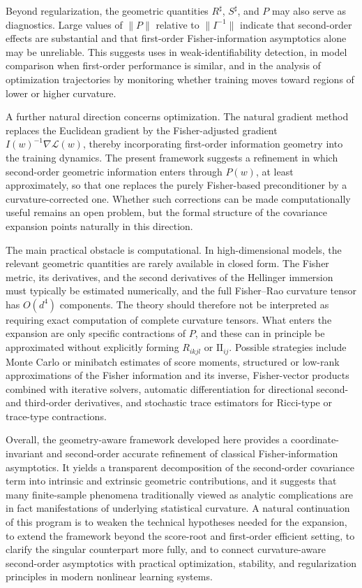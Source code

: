 \documentclass[11pt,letterpaper]{amsart}
\numberwithin{equation}{section}
\theoremstyle{plain}
\theoremstyle{definition}
\theoremstyle{remark}
\begin{document}
Beyond regularization, the geometric quantities \(R^\sharp\), \(S^\sharp\), and \(P\) may also serve as diagnostics. Large values of \(\|P\|\) relative to \(\|I^{-1}\|\) indicate that second-order effects are substantial and that first-order Fisher-information asymptotics alone may be unreliable. This suggests uses in weak-identifiability detection, in model comparison when first-order performance is similar, and in the analysis of optimization trajectories by monitoring whether training moves toward regions of lower or higher curvature.

A further natural direction concerns optimization. The natural gradient method replaces the Euclidean gradient by the Fisher-adjusted gradient \(I(w)^{-1}\nabla \mathcal L(w)\), thereby incorporating first-order information geometry into the training dynamics. The present framework suggests a refinement in which second-order geometric information enters through \(P(w)\), at least approximately, so that one replaces the purely Fisher-based preconditioner by a curvature-corrected one. Whether such corrections can be made computationally useful remains an open problem, but the formal structure of the covariance expansion points naturally in this direction.

The main practical obstacle is computational. In high-dimensional models, the relevant geometric quantities are rarely available in closed form. The Fisher metric, its derivatives, and the second derivatives of the Hellinger immersion must typically be estimated numerically, and the full Fisher--Rao curvature tensor has \(O(d^4)\) components. The theory should therefore not be interpreted as requiring exact computation of complete curvature tensors. What enters the expansion are only specific contractions of \(P\), and these can in principle be approximated without explicitly forming \(R_{ikjl}\) or \(\mathrm{II}_{ij}\). Possible strategies include Monte Carlo or minibatch estimates of score moments, structured or low-rank approximations of the Fisher information and its inverse, Fisher-vector products combined with iterative solvers, automatic differentiation for directional second- and third-order derivatives, and stochastic trace estimators for Ricci-type or trace-type contractions.

Overall, the geometry-aware framework developed here provides a coordinate-invariant and second-order accurate refinement of classical Fisher-information asymptotics. It yields a transparent decomposition of the second-order covariance term into intrinsic and extrinsic geometric contributions, and it suggests that many finite-sample phenomena traditionally viewed as analytic complications are in fact manifestations of underlying statistical curvature. A natural continuation of this program is to weaken the technical hypotheses needed for the expansion, to extend the framework beyond the score-root and first-order efficient setting, to clarify the singular counterpart more fully, and to connect curvature-aware second-order asymptotics with practical optimization, stability, and regularization principles in modern nonlinear learning systems.
\end{document}

